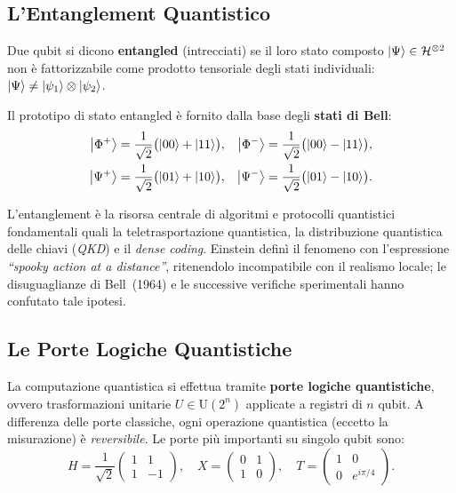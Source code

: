\subsection{L'Entanglement Quantistico}
\label{subsec:entanglement}

\begin{principio}[Entanglement]
  Due qubit si dicono \textbf{entangled} (intrecciati) se il loro stato
  composto $\ket{\Psi} \in \mathcal{H}^{\otimes 2}$ non è fattorizzabile come
  prodotto tensoriale degli stati individuali:
  $\ket{\Psi} \neq \ket{\psi_1} \otimes \ket{\psi_2}$.
\end{principio}

Il prototipo di stato entangled è fornito dalla base degli \textbf{stati di Bell}:
\begin{align}
  \ket{\Phi^+} &= \frac{1}{\sqrt{2}}\bigl(\ket{00} + \ket{11}\bigr), &
  \ket{\Phi^-} &= \frac{1}{\sqrt{2}}\bigl(\ket{00} - \ket{11}\bigr), \\
  \ket{\Psi^+} &= \frac{1}{\sqrt{2}}\bigl(\ket{01} + \ket{10}\bigr), &
  \ket{\Psi^-} &= \frac{1}{\sqrt{2}}\bigl(\ket{01} - \ket{10}\bigr).
\end{align}

L'entanglement è la risorsa centrale di algoritmi e protocolli quantistici
fondamentali quali la teletrasportazione quantistica, la distribuzione
quantistica delle chiavi (\textit{QKD}) e il \textit{dense coding}.
Einstein definì il fenomeno con l'espressione \textit{``spooky action at a
distance''}, ritenendolo incompatibile con il realismo locale; le disuguaglianze
di Bell~(1964) e le successive verifiche sperimentali hanno confutato tale ipotesi.

\subsection{Le Porte Logiche Quantistiche}
\label{subsec:porte}

La computazione quantistica si effettua tramite \textbf{porte logiche
quantistiche}, ovvero trasformazioni unitarie $U \in \mathrm{U}(2^n)$ applicate
a registri di $n$ qubit. A differenza delle porte classiche, ogni operazione
quantistica (eccetto la misurazione) è \textit{reversibile}.
Le porte più importanti su singolo qubit sono:
\begin{equation}
  H = \frac{1}{\sqrt{2}}\begin{pmatrix}1 & 1 \\ 1 & -1\end{pmatrix}, \quad
  X = \begin{pmatrix}0 & 1 \\ 1 & 0\end{pmatrix}, \quad
  T = \begin{pmatrix}1 & 0 \\ 0 & e^{i\pi/4}\end{pmatrix}.
\end{equation}

